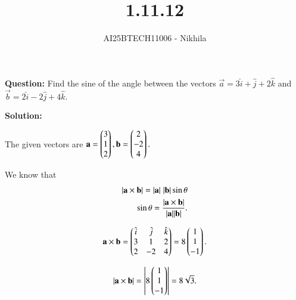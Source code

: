 \documentclass[journal]{IEEEtran}
\begin{document}

\vspace{3cm}

\title{1.11.12}
\author{AI25BTECH11006 - Nikhila}
{\let\newpage\relax\maketitle}


\renewcommand{\thefigure}{\theenumi}
\renewcommand{\thetable}{\theenumi}
\setlength{\intextsep}{10pt} %


\renewcommand{\thetable}{\theenumi}


\textbf{Question:} Find the sine of the angle between the vectors  $\vec{a} = 3\hat{i} + \hat{j} + 2\hat{k}$ and\\
\hspace*{1em} $\vec{b} = 2\hat{i} - 2\hat{j} + 4\hat{k}.$

\vspace{2em}

\textbf{Solution:}


The given vectors are $\vec{a} = \myvec{3 \\ 1 \\ 2}, \vec{b} = \myvec{2 \\ -2 \\ 4}.$

We know that 
\begin{align}
|\vec{a}\times\vec{b}| = |\vec{a}| \hspace{0.3em} |\vec{b}|\sin\theta \\
\sin\theta = \frac{|\vec{a}\times \vec{b}|}{|\vec{a}||\vec{b}|}.
\end{align}

\begin{align}
\vec{a} \times \vec{b} = 
\myvec{ 
\hat{i} & \hat{j} & \hat{k} \\ 
3 & 1 & 2 \\ 
2 & -2 & 4 
}  =  8\myvec{1 \\ 1 \\ -1}.
\end{align}

\begin{align}    
|\vec{a}\times\vec{b}| =  \left| 8\myvec{1 \\ 1 \\ -1} \right|  =  8\sqrt{3}.
\end{align}
\end{document}
